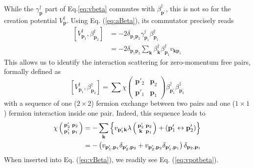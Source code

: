 \documentclass[epj]{svjour}
\newcommand{\vk}{\ensuremath{\mathbf{k}}}
\newcommand{\vp}{\ensuremath{\mathbf{p}}}
\begin{document}
While the $\gamma^{\dagger}_\vp$ part of Eq.\eqref{eq:vbeta} 
commutes with $%
\beta^{\dagger}_{\vp ^\prime}$, 
this is not so for the creation potential $%
V^{\dagger}_\vp$. Using Eq. (\ref{eq:aBeta}), its commutator precisely reads 
\begin{equation}\begin{split}  \label{eq:vpotbeta}
\left[V^{\dagger}_{\mathbf{p} _1},\beta^{\dagger}_{\mathbf{p} _2}\right] 
&=-2\delta_{\mathbf{p} _1\mathbf{p} _2}\gamma^{\dagger}_{\mathbf{p}
_1}\beta^{\dagger}_{\mathbf{p} _1}\\
&=-2\delta_{\mathbf{p} _1\mathbf{p} _2}\sum_\mathbf{k}\beta^{\dagger}_{\mathbf{k}}\beta^{\dagger}_{\mathbf{p} _1}v_{\mathbf{k}\mathbf{p} _1}
\end{split}\end{equation}
This allows us to identify the interaction scattering for zero-momentum free pairs,
formally defined as \cite{CobosonPhysicsReports}
\begin{equation}  \label{eq:vBeta}
\left[V^{\dagger}_{\mathbf{p} _1},\beta^{\dagger}_{\mathbf{p} _2}\right] 
=\sum\chi\left(\begin{smallmatrix}\vp'_2&\vp_2\\\vp'_1&\vp_1\end{smallmatrix}%
\right)  \beta^{\dagger}_{\mathbf{p} ^{\prime}_1}\beta^{\dagger}_{\mathbf{p}
^{\prime}_2}
\end{equation}
with a sequence of one ($2\times2$) fermion exchange between two pairs and one ($1\times1$) fermion interaction inside one pair. Indeed, this sequence leads to
\begin{equation}  \label{eq:interactSc}
\begin{split}
\chi\left(\begin{smallmatrix}\vp'_2&\vp_2\\\vp'_1&\vp_1\end{smallmatrix}%
\right)  &=-\sum_\vk\left\{v_{\mathbf{p} ^{\prime}_1\mathbf{k} }\lambda\left(%
\begin{smallmatrix}\vp'_2&\vp_2\\\vk&\vp_1\end{smallmatrix}\right)  +\left(%
\mathbf{p} ^{\prime}_1\leftrightarrow\mathbf{p} ^{\prime}_2\right) \right\} 
\\
&=-\left(v_{\mathbf{p} ^{\prime}_1,\mathbf{p} _1}\delta_{\mathbf{p}
^{\prime}_2,\mathbf{p} _2}+v_{\mathbf{p} ^{\prime}_2,\mathbf{p} _2}\delta_{%
\mathbf{p} ^{\prime}_1,\mathbf{p} _1}\right) \delta_{\mathbf{p} _2,\mathbf{p}
_1}
\end{split}%
\end{equation}
When inserted into Eq. (\ref{eq:vBeta}), we readily see Eq. (\ref{eq:vpotbeta}). 
\end{document}
